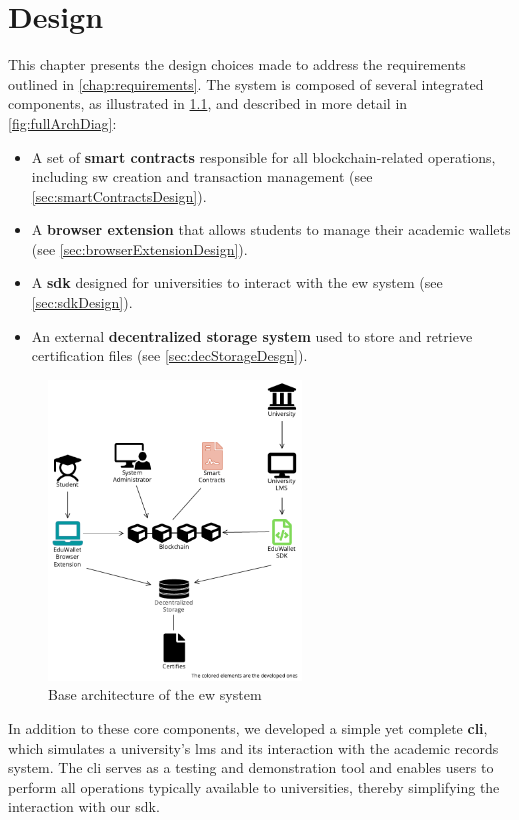 \chapter{Design}
This chapter presents the design choices made to address the requirements outlined in \cref{chap:requirements}. The system is composed of several integrated components, as illustrated in \cref{fig:baseArchDiag}, and described in more detail in \cref{fig:fullArchDiag}:
\begin{itemize}
    \item A set of \textbf{smart contracts} responsible for all blockchain-related operations, including \acrshort{sw} creation and transaction management (see \cref{sec:smartContractsDesign}).
    \item A \textbf{browser extension} that allows students to manage their academic wallets (see \cref{sec:browserExtensionDesign}).
    \item A \textbf{\acrfull{sdk}} designed for universities to interact with the \acrshort{ew} system (see \cref{sec:sdkDesign}).
    \item An external \textbf{decentralized storage system} used to store and retrieve certification files (see \cref{sec:decStorageDesgn}).
\end{itemize}
\begin{figure}
  \centering
  \includegraphics[width=0.6\textwidth]{figures/Architecture diagram basic.pdf}
  \caption[System basic architecture diagram]{Base architecture of the \acrlong{ew} system}
  \label{fig:baseArchDiag}
\end{figure}
In addition to these core components, we developed a simple yet complete \textbf{\acrfull{cli}}, which simulates a university's \acrshort{lms} and its interaction with the academic records system. The \acrshort{cli} serves as a testing and demonstration tool and enables users to perform all operations typically available to universities, thereby simplifying the interaction with our \acrshort{sdk}.

